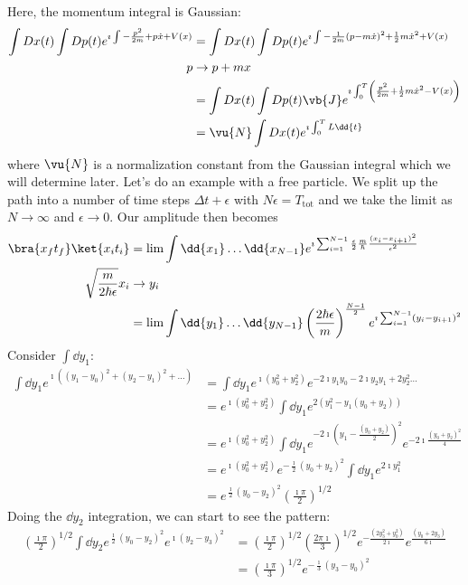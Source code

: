\documentclass[a4paper,twoside,master.tex]{subfiles}
\begin{document}
Here, the momentum integral is Gaussian:
\begin{align}
    \int Dx(t) \int Dp(t) e^{\imath \int - \frac{p^2}{2m} + p\dot{x} + V(x)} &= \int Dx(t) \int Dp(t) e^{\imath \int - \frac{1}{2m}(p - m\dot{x})^2 + \frac{1}{2} m\dot{x}^2 + V(x)} \\
    p &\to p+mx\\
    &= \int Dx(t) \int Dp(t) \vb{J} e^{\imath \int_0^T \left( \frac{p^2}{2m} + \frac{1}{2} m\dot{x}^2 - V(x) \right)} \\
    &= \vu{N} \int Dx(t) e^{\imath \int_0^T L \dd{t}}
\end{align}
where $ \vu{N} $ is a normalization constant from the Gaussian integral which we will determine later. Let's do an example with a free particle. We split up the path into a number of time steps $ \Delta t + \epsilon $ with $ N \epsilon = T_{\text{tot}} $ and we take the limit as $ N \to \infty $ and $ \epsilon \to 0 $. Our amplitude then becomes
\begin{align}
    \bra{x_f t_f}\ket{x_i t_i} &= \lim \int \dd{x_1} \ldots \dd{x_{N-1}} e^{\imath \sum_{i=1}^{N-1} \frac{\epsilon}{2} \frac{m}{\hbar} \frac{(x_i - x_{i+1})^2}{\epsilon^2}} \\
    \sqrt{\frac{m}{2 \hbar \epsilon}} x_i &\to y_i\\
    &= \lim \int \dd{y_1} \ldots \dd{y_{N-1}} \left( \frac{2 \hbar \epsilon}{m} \right)^{\frac{N-1}{2}} e^{\imath \sum_{i=1}^{N-1} (y_i - y_{i+1})^2}
\end{align}
Consider $ \int \dd{y_1} $:
\begin{align}
    \int \dd{y_1} e^{\imath \left( (y_1 - y_0)^2 + (y_2 - y_1)^2 + \ldots \right)} &= \int \dd{y_1} e^{\imath (y_0^2 + y_2^2)} e^{-2 \imath y_1 y_0 - 2 \imath y_2 y_1 + 2 y_2^2 \ldots} \\
    &= e^{\imath (y_0^2 + y_2^2)} \int \dd{y_1} e^{2(y_1^2 - y_1 (y_0 + y_2))} \\
    &= e^{\imath (y_0^2 + y_2^2)} \int \dd{y_1} e^{-2 \imath \left( y_1 - \frac{(y_0 + y_2)}{2} \right)^2} e^{-2 \imath \frac{(y_0 + y_2)^2}{4}} \\
    &= e^{\imath (y_0^2 + y_2^2)} e^{- \frac{\imath}{2} (y_0 + y_2)^2} \int \dd{y_1} e^{2 \imath y_1^2} \\
    &= e^{\frac{\imath}{2} (y_0 - y_2)^2} \left( \frac{\imath \pi}{2} \right)^{1/2} 
\end{align}
Doing the $ \dd{y_2} $ integration, we can start to see the pattern:
\begin{align}
    \left( \frac{\imath \pi}{2} \right)^{1/2} \int \dd{y_2} e^{\frac{\imath}{2} (y_0 - y_2)^2} e^{\imath (y_2 - y_3)^2} &= \left( \frac{\imath \pi}{2} \right)^{1/2} \left( \frac{2 \pi \imath}{3} \right)^{1/2} e^{- \frac{(2 y_3^2 + y_0^2)}{2 \imath}} e^{\frac{(y_0 + 2y_3)}{6 \imath}} \\
    &= \left( \frac{\imath \pi}{3} \right)^{1/2} e^{- \frac{\imath}{3} (y_3 - y_0)^2} 
\end{align}
\end{document}
